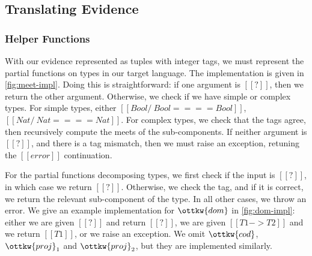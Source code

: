 \documentclass[11pt]{article}
\begin{document}
\subsection{Translating Evidence}

\subsubsection{Helper Functions}

With our evidence represented as tuples with integer tags, we must represent the partial functions
on types in our target language.
The implementation is given in \autoref{fig:meet-impl}.
Doing this is straightforward: if one argument is $[[?]]$,
then we return the other argument. Otherwise, we check if we have simple or complex types.
For simple types, either $[[Bool /\ Bool ==== Bool]]$, $[[Nat /\ Nat ==== Nat]]$.
For complex types, we check that the tags agree, then recursively compute the meets of the sub-components.
If neither argument is $[[?]]$, and there is a tag mismatch, then we must raise an exception, retuning the $[[error]]$
continuation.

For the partial functions decomposing types, we first check if the input is $[[?]]$,
in which case we return $[[?]]$. Otherwise, we check the tag, and if it is correct, we return
the relevant sub-component of the type. In all other cases, we throw an error.
We give an example implementation for $\ottkw{dom}$ in \autoref{fig:dom-impl}: either we are given $[[?]]$
and return $[[?]]$, we are given $[[T1 -> T2]]$ and we return $[[T1]]$, or we raise an exception.
We omit $\ottkw{cod}$, $\ottkw{proj}_1$ and $\ottkw{proj}_2$, but they are implemented similarly.
\end{document}
